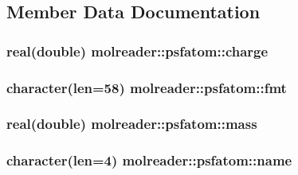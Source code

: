 \subsection{Member Data Documentation}
\hypertarget{structmolreader_1_1psfatom_abbebc3b397af2ee56c04933bc3008753}{
\subsubsection[{charge}]{\setlength{\rightskip}{0pt plus 5cm}real(double) molreader\-::psfatom\-::charge\hspace{0.3cm}{\ttfamily [private]}}}\label{structmolreader_1_1psfatom_abbebc3b397af2ee56c04933bc3008753}
\hypertarget{structmolreader_1_1psfatom_a2c662eb006fdf85c624b28a08f65cc7b}{
\subsubsection[{fmt}]{\setlength{\rightskip}{0pt plus 5cm}character(len=58) molreader\-::psfatom\-::fmt\hspace{0.3cm}{\ttfamily [private]}}}\label{structmolreader_1_1psfatom_a2c662eb006fdf85c624b28a08f65cc7b}
\hypertarget{structmolreader_1_1psfatom_ae3774dcb1dec79eb1f7d5e26331056bb}{
\subsubsection[{mass}]{\setlength{\rightskip}{0pt plus 5cm}real(double) molreader\-::psfatom\-::mass\hspace{0.3cm}{\ttfamily [private]}}}\label{structmolreader_1_1psfatom_ae3774dcb1dec79eb1f7d5e26331056bb}
\hypertarget{structmolreader_1_1psfatom_a5f7ded307db07f842d21aee2dfca772b}{
\subsubsection[{name}]{\setlength{\rightskip}{0pt plus 5cm}character(len=4) molreader\-::psfatom\-::name\hspace{0.3cm}{\ttfamily [private]}}}\label{structmolreader_1_1psfatom_a5f7ded307db07f842d21aee2dfca772b}
